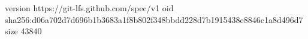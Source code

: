 version https://git-lfs.github.com/spec/v1
oid sha256:d06a702d7d696b1b3683a1f8b802f348bbdd228d7b1915438e8846c1a8d496d7
size 43840
